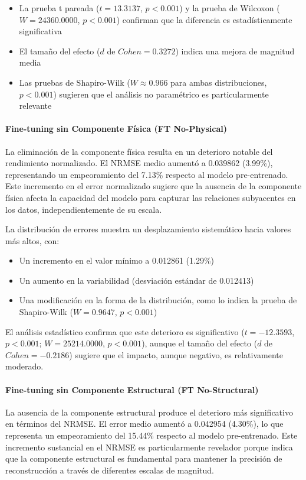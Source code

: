 \begin{itemize}
    \item La prueba t pareada ($t = 13.3137$, $p < 0.001$) y la prueba de Wilcoxon ($W = 24360.0000$, $p < 0.001$) confirman que la diferencia es estadísticamente significativa
    \item El tamaño del efecto ($d$ de $Cohen = 0.3272$) indica una mejora de magnitud media
    \item Las pruebas de Shapiro-Wilk ($W \approx 0.966$ para ambas distribuciones, $p < 0.001$) sugieren que el análisis no paramétrico es particularmente relevante
\end{itemize}

\paragraph{Fine-tuning sin Componente Física (FT No-Physical)}
La eliminación de la componente física resulta en un deterioro notable del rendimiento normalizado. El NRMSE medio aumentó a 0.039862 (3.99\%), representando un empeoramiento del 7.13\% respecto al modelo pre-entrenado. Este incremento en el error normalizado sugiere que la ausencia de la componente física afecta la capacidad del modelo para capturar las relaciones subyacentes en los datos, independientemente de su escala.

La distribución de errores muestra un desplazamiento sistemático hacia valores más altos, con:

\begin{itemize}
    \item Un incremento en el valor mínimo a 0.012861 (1.29\%)
    \item Un aumento en la variabilidad (desviación estándar de 0.012413)
    \item Una modificación en la forma de la distribución, como lo indica la prueba de Shapiro-Wilk ($W = 0.9647$, $p < 0.001$)
\end{itemize}

El análisis estadístico confirma que este deterioro es significativo ($t = -12.3593$, $p < 0.001$; $W = 25214.0000$, $p < 0.001$), aunque el tamaño del efecto ($d$ de $Cohen = -0.2186$) sugiere que el impacto, aunque negativo, es relativamente moderado.

\paragraph{Fine-tuning sin Componente Estructural (FT No-Structural)}
La ausencia de la componente estructural produce el deterioro más significativo en términos del NRMSE. El error medio aumentó a 0.042954 (4.30\%), lo que representa un empeoramiento del 15.44\% respecto al modelo pre-entrenado. Este incremento sustancial en el NRMSE es particularmente revelador porque indica que la componente estructural es fundamental para mantener la precisión de reconstrucción a través de diferentes escalas de magnitud.

